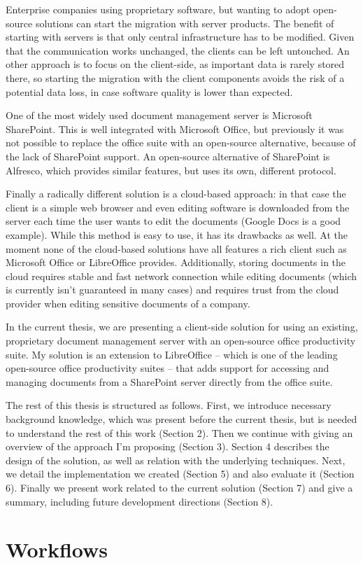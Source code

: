 Enterprise companies using proprietary software, but wanting to adopt
open-source solutions can start the migration with server products. The benefit
of starting with servers is that only central infrastructure has to be
modified. Given that the communication works unchanged, the clients can be left
untouched. An other approach is to focus on the client-side, as important data
is rarely stored there, so starting the migration with the client components
avoids the risk of a potential data loss, in case software quality is lower
than expected.

One of the most widely used document management server is Microsoft
SharePoint\cite{sharepoint}. This is well integrated with Microsoft Office, but
previously it was not possible to replace the office suite with an open-source
alternative, because of the lack of SharePoint support. An open-source
alternative of SharePoint is Alfresco\cite{alfresco}, which provides similar
features, but uses its own, different protocol.

Finally a radically different solution is a cloud-based approach: in that case
the client is a simple web browser and even editing software is downloaded from
the server each time the user wants to edit the documents (Google
Docs\cite{google-docs} is a good example). While this method is easy to use, it
has its drawbacks as well. At the moment none of the cloud-based solutions have
all features a rich client such as Microsoft Office or LibreOffice provides.
Additionally, storing documents in the cloud requires stable and fast network
connection while editing documents (which is currently isn't guaranteed in many
cases) and requires trust from the cloud provider when editing sensitive
documents of a company.

In the current thesis, we are presenting a client-side solution for using an
existing, proprietary document management server with an open-source office
productivity suite. My solution is an extension to LibreOffice -- which is one
of the leading open-source office productivity suites -- that adds support for
accessing and managing documents from a SharePoint server directly from the
office suite.

The rest of this thesis is structured as follows. First, we introduce necessary
background knowledge, which was present before the current thesis, but is
needed to understand the rest of this work (Section 2). Then we continue with
giving an overview of the approach I'm proposing (Section 3). Section 4
describes the design of the solution, as well as relation with the underlying
techniques. Next, we detail the implementation we created (Section 5) and also
evaluate it (Section 6). Finally we present work related to the current
solution (Section 7) and give a summary, including future development
directions (Section 8).

\section{Workflows}
